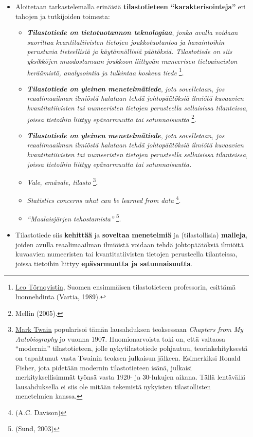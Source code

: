 \documentclass[
]{book}
\providecommand{\tightlist}{%
  \setlength{\itemsep}{0pt}\setlength{\parskip}{0pt}}
\begin{document}
\begin{itemize}
\tightlist
\item
  Aloitetaan tarkastelemalla erinäisiä \textbf{tilastotieteen ``karakterisointeja''} eri tahojen ja tutkijoiden toimesta:

  \begin{itemize}
  \tightlist
  \item
    \textbf{\emph{Tilastotiede on tietotuotannon teknologiaa}}, \emph{jonka avulla voidaan suorittaa kvantitatiivisten tietojen joukkotuotantoa ja havaintoihin perustuvia tieteellisiä ja käytännöllisiä päätöksiä. Tilastotiede on siis yksikköjen muodostamaan joukkoon liittyvän numeerisen tietoaineiston keräämistä, analysointia ja tulkintaa koskeva tiede} \footnote{\href{https://fi.wikipedia.org/wiki/Leo_T\%C3\%B6rnqvist}{Leo Törnqvistin}, Suomen ensimmäisen tilastotieteen professorin, esittämä luonnehdinta (Vartia, 1989).}.
  \item
    \textbf{\emph{Tilastotiede on yleinen menetelmätiede}}, \emph{jota sovelletaan, jos reaalimaailman ilmiöstä halutaan tehdä johtopäätöksiä ilmiötä kuvaavien kvantitatiivisten tai numeeristen tietojen perusteella sellaisissa tilanteissa, joissa tietoihin liittyy epävarmuutta tai satunnaisuutta} \footnote{Mellin (2005).}.
  \item
    \textbf{\emph{Tilastotiede on yleinen menetelmätiede}}, \emph{jota sovelletaan, jos reaalimaailman ilmiöstä halutaan tehdä johtopäätöksiä ilmiötä kuvaavien kvantitatiivisten tai numeeristen tietojen perusteella sellaisissa tilanteissa, joissa tietoihin liittyy epävarmuutta tai satunnaisuutta.}
  \item
    \emph{Vale, emävale, tilasto} \footnote{\href{https://fi.wikipedia.org/wiki/Mark_Twain}{Mark Twain} popularisoi tämän lausahduksen teoksessaan \emph{Chapters from My Autobiography} jo vuonna 1907. Huomionarvoista toki on, että valtaosa ``modernin'' tilastotieteen, jolle nykytilastotiede pohjautuu, teoriakehityksestä on tapahtunut vasta Twainin teoksen julkaisun jälkeen. Esimerkiksi Ronald Fisher, jota pidetään modernin tilastotieteen isänä, julkaisi merkityksellisimmät työnsä vasta 1920- ja 30-lukujen aikana. Tällä lentävällä lausahduksella ei siis ole mitään tekemistä nykyisten tilastollisten menetelmien kanssa.}.
  \item
    \emph{Statistics concerns what can be learned from data} \footnote{(A.C. Davison)}.
  \item
    \emph{``Maalaisjärjen tehostamista''} \footnote{(Sund, 2003)}.
  \end{itemize}
\item
  Tilastotiede siis \textbf{kehittää} ja \textbf{soveltaa menetelmiä} ja (tilastollisia) \textbf{malleja}, joiden avulla reaalimaailman ilmiöistä voidaan tehdä johtopäätöksiä ilmiöitä kuvaavien numeeristen tai kvantitatiivisten tietojen perusteella tilanteissa, joissa tietoihin liittyy \textbf{epävarmuutta ja satunnaisuutta}.


\end{itemize}
\end{document}
